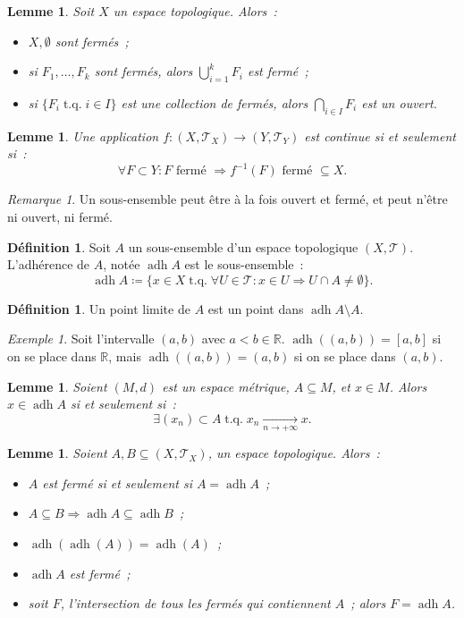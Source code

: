 \documentclass{report}
\newtheorem{lem}[thm]{Lemme}
\theoremstyle{definition}
\newtheorem{déf}[thm]{Définition}
\theoremstyle{remark}
\newtheorem*{rmq}{Remarque}
\newtheorem{ex}{Exemple}[chapter]
\DeclareMathOperator{\tq}{\text{ t.q. }}
\DeclareMathOperator{\adh}{adh}
\newcommand{\R}{\mathbb R}
\renewcommand{\top}{\mathcal T}
\begin{document}
		\begin{lem} Soit $X$ un espace topologique. Alors~:
		\begin{itemize}
			\item[$(i)$]   $X, \emptyset$ sont fermés~;
			\item[$(ii)$]  si $F_1, \ldots, F_k$ sont fermés, alors $\bigcup_{i=1}^kF_i$ est fermé~;
			\item[$(iii)$] si $\{F_i \tq i \in I\}$ est une collection de fermés, alors $\bigcap_{i \in I}F_i$ est un ouvert.
		\end{itemize}
		\end{lem}

		\begin{lem} Une application $f : (X, \top_X) \to (Y, \top_Y)$ est continue si et seulement si~:
		\[\forall F \subset Y : F \text{ fermé } \Rightarrow f^{-1}(F) \text{ fermé } \subseteq X.\]
		\end{lem}

		\begin{rmq} Un sous-ensemble peut être à la fois ouvert et fermé, et peut n'être ni ouvert, ni fermé.
		\end{rmq}

		\begin{déf} Soit $A$ un sous-ensemble d'un espace topologique $(X, \top)$. L'adhérence de $A$, notée $\adh A$ est le sous-ensemble~:
		\[\adh A \coloneqq \{x \in X \tq \forall U \in \top : x \in U \Rightarrow U \cap A \neq \emptyset\}.\]
		\end{déf}

		\begin{déf} Un point limite de $A$ est un point dans $\adh A \setminus A$.
		\end{déf}

		\begin{ex} Soit l'intervalle $(a, b)$ avec $a < b \in \R$. $\adh\left((a, b)\right) = [a, b]$ si on se place dans $\R$, mais
		$\adh\left((a, b)\right) = (a, b)$ si on se place dans $(a, b)$.
		\end{ex}

		\begin{lem} Soient $(M, d)$ est un espace métrique, $A \subseteq M$, et $x \in M$. Alors $x \in \adh A$ si et seulement si~:
		\[\exists (x_n) \subset A \tq x_n \xrightarrow[n \to +\infty]{} x.\]
		\end{lem}

		\begin{lem} Soient $A, B \subseteq (X, \top_X)$, un espace topologique. Alors~:
		\begin{itemize}
			\item[$(i)$]   $A$ est fermé si et seulement si $A = \adh A$~;
			\item[$(ii)$]  $A \subseteq B \Rightarrow \adh A \subseteq \adh B$~;
			\item[$(iii)$] $\adh\left(\adh(A)\right) = \adh(A)$~;
			\item[$(iv)$]  $\adh A$ est fermé~;
			\item[$(v)$]   soit $F$, l'intersection de tous les fermés qui contiennent $A$~; alors $F = \adh A$.
		\end{itemize}
		\end{lem}
\end{document}
